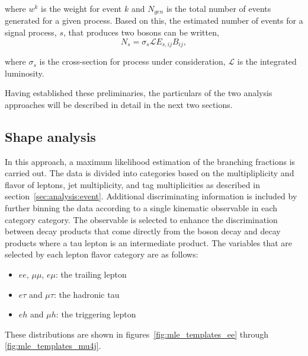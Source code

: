 \noindent
where $w^{k}$ is the weight for event $k$ and $N_{gen}$ is the total
number of events generated for a given process.  Based on this, the
estimated number of events for a signal process, $s$, that produces two
\PW bosons can be written,
\begin{equation}
\label{eq:data_model}
    N_{s} = \sigma_{s} \mathcal{L} E_{s,ij} B_{ij} ,
\end{equation}

\noindent
where $\sigma_{s}$ is the cross-section for process under consideration,
$\mathcal{L}$ is the integrated luminosity. 

Having established these preliminaries, the particulars of the two
analysis approaches will be described in detail in the next two
sections.



\FloatBarrier







\subsection{Shape analysis}
\label{sec:analysis:method:mle}

In this approach, a maximum likelihood estimation of the branching
fractions is carried out.  The data is divided into categories based on
the multipliplicity and flavor of leptons, jet multiplicity, and \PQb tag
multiplicities as described in section~\ref{sec:analysis:event}.  Additional
discriminating information is included by further binning the data
according to a single kinematic observable in each category category.
The observable is selected to enhance the discrimination between decay
products that come directly from the \PW boson decay and decay products
where a tau lepton is an intermediate product.  The variables that are
selected by each lepton flavor category are as follows:

\begin{itemize}
    \item $ee$, $\mu\mu$, $e\mu$: the trailing lepton \pt
    \item $e\tau$ and $\mu\tau$: the hadronic tau \pt
    \item $eh$ and $\mu h$: the triggering lepton \pt
\end{itemize}

These distributions are shown in figures~\ref{fig:mle_templates_ee} through \ref{fig:mle_templates_mu4j}.


